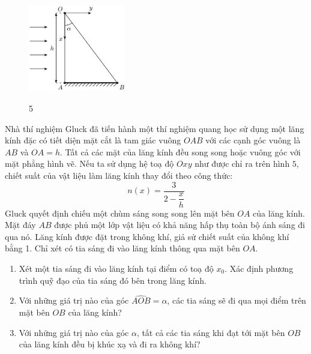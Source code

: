 \vspace{-1cm}
\begin{figure}
  \centering
  \includegraphics[width=0.38\textwidth]{Figures/Fig 5.jpg}
  \begin{center}
    \figurename{ 5}
  \end{center}
\end{figure}

\noindent Nhà thí nghiệm Gluck đã tiến hành một thí nghiệm quang học sử dụng một lăng kính đặc có tiết diện mặt cắt là tam giác vuông $OAB$ với các cạnh góc vuông là $AB$ và $OA=h$. Tất cả các mặt của lăng kính đều song song hoặc vuông góc với mặt phẳng hình vẽ. Nếu ta sử dụng hệ toạ độ $Oxy$ như được chỉ ra trên hình $5$, chiết suất của vật liệu làm lăng kính thay đổi theo công thức:
\begin{equation*}
  n(x)=\frac{3}{2-\dfrac{x}{h}}
\end{equation*}
Gluck quyết định chiếu một chùm sáng song song lên mặt bên $OA$ của lăng kính. Mặt đáy $AB$ được phủ một lớp vật liệu có khả năng hấp thụ toàn bộ ánh sáng đi qua nó. Lăng kính được đặt trong không khí, giả sử chiết suất của không khí bằng 1. Chỉ xét có tia sáng đi vào lăng kính thông qua mặt bên $OA$.
\begin{enumerate}
  \item Xét một tia sáng đi vào lăng kính tại điểm có toạ độ $x_{0}$. Xác định phương trình quỹ đạo của tia sáng đó bên trong lăng kính.
  \item Với những giá trị nào của góc $\hat{AOB}=\alpha$, các tia sáng sẽ đi qua mọi điểm trên mặt bên $OB$ của lăng kính?
  \item Với những giá trị nào của góc $\alpha$, tất cả các tia sáng khi đạt tới mặt bên $OB$ của lăng kính đều bị khúc xạ và đi ra không khí?
\end{enumerate}